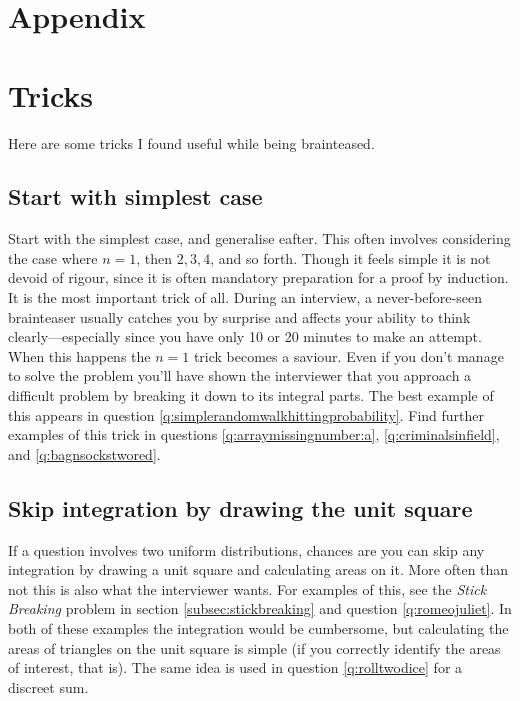 \documentclass[a4paper]{article}
\begin{document}
\clearpage
\appendix

{}
\section*{Appendix}


\section{Tricks}
\label{ap:tricks}
Here are some tricks I found useful while being brainteased.

\subsection{Start with simplest case}
Start with the simplest case, and generalise eafter.
This often involves considering the case where $n=1$, then $2,3,4$, and so forth.
Though it feels simple it is not devoid of rigour, since it is often mandatory preparation for a proof by induction.
It is the most important trick of all.
During an interview, a never-before-seen brainteaser usually catches you by surprise and affects your ability to think clearly---especially since you have only 10 or 20 minutes to make an attempt.
When this happens the $n=1$ trick becomes a saviour.
Even if you don't manage to solve the problem you'll have shown the interviewer that you approach a difficult problem by breaking it down to its integral parts.
The best example of this appears in question
\ref{q:simplerandomwalkhittingprobability}.
Find further examples of this trick in questions
\ref{q:arraymissingnumber:a},
\ref{q:criminalsinfield},
and
\ref{q:bagnsockstwored}.

\subsection{Skip integration by drawing the unit square}
If a question involves two uniform distributions, chances are you can skip any integration by drawing a unit square and calculating areas on it.
More often than not this is also what the interviewer wants.
For examples of this, see the \emph{Stick Breaking} problem in section \ref{subsec:stickbreaking} and question \ref{q:romeojuliet}.
In both of these examples the integration would be cumbersome, but calculating the areas of triangles on the unit square is simple (if you correctly identify the areas of interest, that is).
The same idea is used in question \ref{q:rolltwodice} for a discreet sum.
\end{document}
